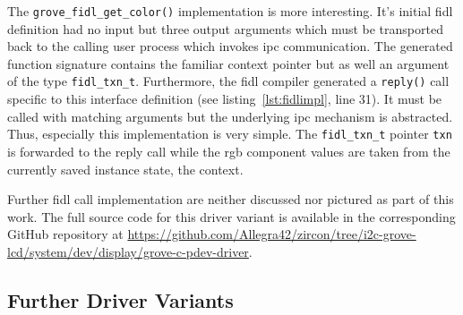 The \texttt{grove_fidl_get_color()} implementation is more interesting.
It's initial \ac{fidl} definition had no input but three output arguments which must be transported back to the calling user process which invokes \ac{ipc} communication.
The generated function signature contains the familiar context pointer but as well an argument of the type \texttt{fidl_txn_t}.
Furthermore, the \ac{fidl} compiler generated a \texttt{reply()} call specific to this interface definition (see listing~\ref{lst:fidlimpl}, line 31).
It must be called with matching arguments but the underlying \ac{ipc} mechanism is abstracted.
Thus, especially this implementation is very simple.
The \texttt{fidl_txn_t} pointer \texttt{txn} is forwarded to the reply call while the \ac{rgb} component values are taken from the currently saved instance state, the context.

Further \ac{fidl} call implementation are neither discussed nor pictured as part of this work.
The full source code for this driver variant is available in the corresponding GitHub repository at \url{https://github.com/Allegra42/zircon/tree/i2c-grove-lcd/system/dev/display/grove-c-pdev-driver}.


\subsection{Further Driver Variants}

